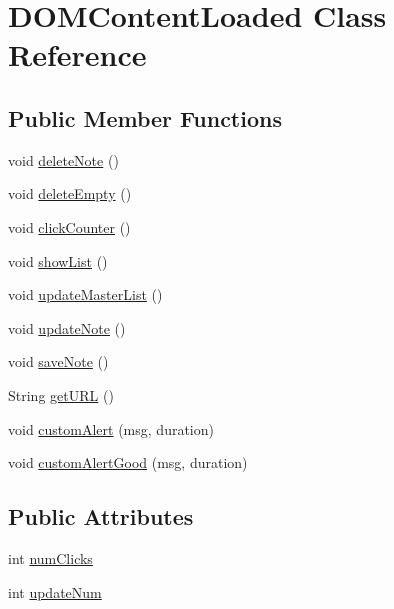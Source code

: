 \hypertarget{class_d_o_m_content_loaded}{}\section{D\+O\+M\+Content\+Loaded Class Reference}
\label{class_d_o_m_content_loaded}
\subsection*{Public Member Functions}
\begin{DoxyCompactItemize}
\item 
void \hyperlink{class_d_o_m_content_loaded_a08ab37a8c435636cf376a8748dce6f25}{delete\+Note} ()
\item 
void \hyperlink{class_d_o_m_content_loaded_a0b00bc687c3f7bee87eccb2aa0e99098}{delete\+Empty} ()
\item 
void \hyperlink{class_d_o_m_content_loaded_a3ada13c27e30a7921dc6de3d0928b8d6}{click\+Counter} ()
\item 
void \hyperlink{class_d_o_m_content_loaded_af7fd8c7ac1052d50a2d2b3186fa69017}{show\+List} ()
\item 
void \hyperlink{class_d_o_m_content_loaded_a6773451115f563a93a7d52016971004d}{update\+Master\+List} ()
\item 
void \hyperlink{class_d_o_m_content_loaded_a5a228b78a1c8a952b3304f9ec596a026}{update\+Note} ()
\item 
void \hyperlink{class_d_o_m_content_loaded_a9680fdf9c56b8536fa5788873cb7e020}{save\+Note} ()
\item 
String \hyperlink{class_d_o_m_content_loaded_a03e60e64122c80b6dd06c48cc727345a}{get\+U\+RL} ()
\item 
void \hyperlink{class_d_o_m_content_loaded_ab11d12ac2eac7f2fce7f06c31917594e}{custom\+Alert} (msg, duration)
\item 
void \hyperlink{class_d_o_m_content_loaded_a838d84f4bc0238418ceee1cc4bffd1ea}{custom\+Alert\+Good} (msg, duration)
\end{DoxyCompactItemize}
\subsection*{Public Attributes}
\begin{DoxyCompactItemize}
\item 
int \hyperlink{class_d_o_m_content_loaded_a62ba4aaa6fb7322d125e7f5f5b2a91ec}{num\+Clicks}
\item 
int \hyperlink{class_d_o_m_content_loaded_a8d1dde1fba9833ca47cf48b8fac4f5fc}{update\+Num}
\end{DoxyCompactItemize}


